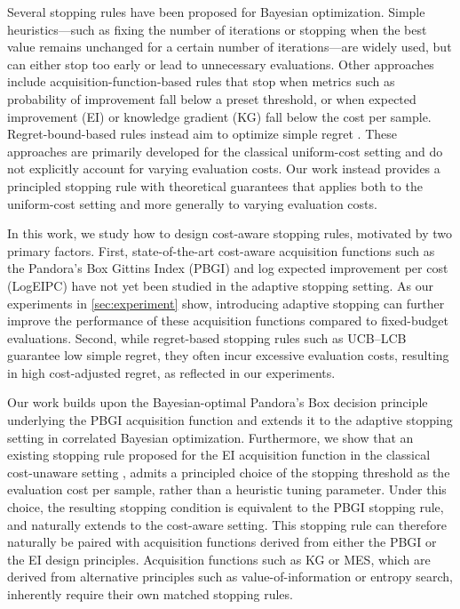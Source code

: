 Several stopping rules have been proposed for Bayesian optimization.
Simple heuristics—such as fixing the number of iterations or stopping when the best value remains unchanged for a certain number of iterations—are widely used, but can either stop too early or lead to unnecessary evaluations.
Other approaches include acquisition-function-based rules that stop when metrics such as probability of improvement \citep{lorenz2015stopping} fall below a preset threshold, or when expected improvement (EI) \citep{nguyen2017regret, zhou2024corrected} or knowledge gradient (KG) \citep{frazier2008knowledge} fall below the cost per sample. Regret-bound-based rules instead aim to optimize simple regret \citep{makarova2022automatic, ishibashi2023stopping, wilson2024stopping, li2023not}.
These approaches are primarily developed for the classical uniform-cost setting and do not explicitly account for varying evaluation costs. Our work instead provides a principled stopping rule with theoretical guarantees that applies both to the uniform-cost setting and more generally to varying evaluation costs.

In this work, we study how to design cost-aware stopping rules, motivated by two primary factors.
First, state-of-the-art cost-aware acquisition functions such as the Pandora's Box Gittins Index (PBGI) \citep{xie2024cost} and log expected improvement per cost (LogEIPC) \citep{ament2023unexpected} have not yet been studied in the adaptive stopping setting.
As our experiments in \cref{sec:experiment} show, introducing adaptive stopping can further improve the performance of these acquisition functions compared to fixed-budget evaluations.
Second, while regret-based stopping rules such as UCB–LCB \citep{makarova2022automatic} guarantee low simple regret, they often incur excessive evaluation costs, resulting in high cost-adjusted regret, as reflected in our experiments.

Our work builds upon the Bayesian-optimal Pandora’s Box decision principle underlying the PBGI acquisition function and extends it to the adaptive stopping setting in correlated Bayesian optimization.
Furthermore, we show that an existing stopping rule proposed for the EI acquisition function in the classical cost-unaware setting \citep{nguyen2017regret,zhou2024corrected}, admits a principled choice of the stopping threshold as the evaluation cost per sample, rather than a heuristic tuning parameter. Under this choice, the resulting stopping condition is equivalent to the PBGI stopping rule, and naturally extends to the cost-aware setting.
This stopping rule can therefore naturally be paired with acquisition functions derived from either the PBGI or the EI design principles. Acquisition functions such as KG or MES, which are derived from alternative principles such as value-of-information or entropy search, inherently require their own matched stopping rules.

